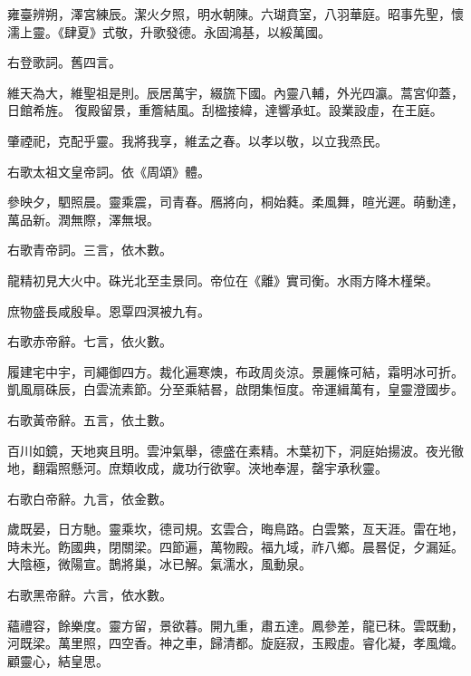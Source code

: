 \begin{pinyinscope}
 雍臺辨朔，澤宮練辰。潔火夕照，明水朝陳。六瑚賁室，八羽華庭。昭事先聖，懷濡上靈。《肆夏》式敬，升歌發德。永固鴻基，以綏萬國。



 右登歌詞。舊四言。



 維天為大，維聖祖是則。辰居萬宇，綴旒下國。內靈八輔，外光四瀛。蒿宮仰蓋，日館希旌。
 復殿留景，重簷結風。刮楹接緯，達響承虹。設業設虛，在王庭。



 肇禋祀，克配乎靈。我將我享，維孟之春。以孝以敬，以立我烝民。



 右歌太祖文皇帝詞。依《周頌》體。



 參映夕，駟照晨。靈乘震，司青春。鴈將向，桐始蕤。柔風舞，暄光遲。萌動達，萬品新。潤無際，澤無垠。



 右歌青帝詞。三言，依木數。



 龍精初見大火中。硃光北至圭景同。帝位在《離》實司衡。水雨方降木槿榮。



 庶物盛長咸殷阜。恩覃四溟被九有。



 右歌赤帝辭。七言，依火數。



 履建宅中宇，司繩御四方。裁化遍寒燠，布政周炎涼。景麗條可結，霜明冰可折。凱風扇硃辰，白雲流素節。分至乘結晷，啟閉集恒度。帝運緝萬有，皇靈澄國步。



 右歌黃帝辭。五言，依土數。



 百川如鏡，天地爽且明。雲沖氣舉，德盛在素精。木葉初下，洞庭始揚波。夜光徹地，翻霜照懸河。庶類收成，歲功行欲寧。浹地奉渥，罄宇承秋靈。



 右歌白帝辭。九言，依金數。



 歲既晏，日方馳。靈乘坎，德司規。玄雲合，晦鳥路。白雲繁，亙天涯。雷在地，時未光。飭國典，閉關梁。四節遍，萬物殿。福九域，祚八鄉。晨晷促，夕漏延。
 大陰極，微陽宣。鵲將巢，冰已解。氣濡水，風動泉。



 右歌黑帝辭。六言，依水數。



 蘊禮容，餘樂度。靈方留，景欲暮。開九重，肅五達。鳳參差，龍已秣。雲既動，河既梁。萬里照，四空香。神之車，歸清都。旋庭寂，玉殿虛。睿化凝，孝風熾。顧靈心，結皇思。



\end{pinyinscope}
